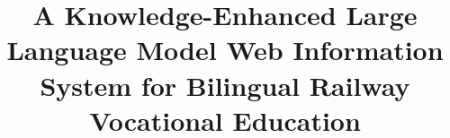 \documentclass{article}
\author{}
\title{A Knowledge-Enhanced Large Language Model Web Information System for Bilingual Railway Vocational Education}
\date{}
\begin{document}
\maketitle

\providecommand{\tightlist}{%
  \setlength{\itemsep}{0pt}\setlength{\parskip}{0pt}}

\end{document}
